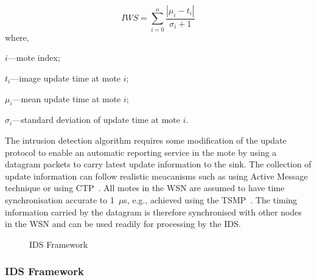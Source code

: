 \documentclass[conference,final]{IEEEtran}
\begin{document}
\begin{equation}
\label{eqn2} 
	\mathit{IWS} = \sum \limits_{i=0}^{n} \frac{\left| \mu_i - t_i \right|}{\sigma_i + 1}
\end{equation}
where, 
\begin{inparaenum}
\item $\mathit{i}$---mote index;%
\item $\mathit{t_i}$---image update time at mote $\mathit{i}$;  
\item $\mathit{\mu_i}$---mean update time at mote $\mathit{i}$;  
\item $\mathit{\sigma_i}$---standard deviation of update time at mote $\mathit{i}$. 
\end{inparaenum}

The intrusion detection algorithm requires some modification of the update protocol to enable an automatic reporting service in the mote by using a datagram packets to carry latest update information to the sink.
The collection of update information can follow realistic meacanisms such as using Active Message technique\cite{tep116} or using CTP~\cite{tep123, ctptosn2014}.
All motes in the WSN are assumed to have time synchronisation accurate to 1~$\mu$s, e.g., achieved using the TSMP~\cite{Pister08tsmp:time}.
The timing information carried by the datagram is therefore synchronised with other nodes in the WSN and can be used readily for processing by the IDS.

\begin{figure}[btp]
    \centering
    \caption{IDS Framework}
    \label{fig:ids_fw}
\end{figure}

\subsubsection*{IDS Framework}
\label{ssc:ids_fw}
\end{document}
